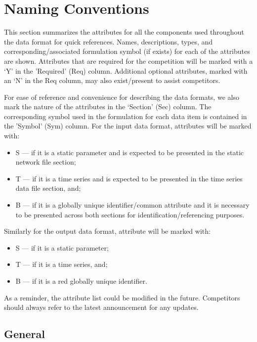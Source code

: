 \documentclass{article}
\begin{document}
\section{Naming Conventions}
\label{sec:naming}
This section summarizes the attributes for all the components used throughout the data format for quick references.
Names, descriptions, types, and corresponding/associated formulation symbol (if exists) for each of the attributes are shown.
Attributes that are required for the competition
will be marked with a `Y' in the 'Required' (Req) column.
Additional optional attributes, marked with an `N' in the Req column, may also exist/present to assist competitors.

For ease of reference and convenience for describing the data formats, we also
mark the nature of the attributes in the `Section' (Sec) column. The corresponding symbol used in the formulation for each data item is contained in the 'Symbol' (Sym) column.
For the input data format, attributes will be marked with:
\begin{itemize}
\item S --- if it is a static parameter and is expected to be presented in the static network file section;
\item T --- if it is a time series and is expected to be presented in the time series data file section, and;
\item B --- if it is a globally unique identifier/common attribute and it is necessary to be presented across both sections for identification/referencing purposes.
\end{itemize}
Similarly for the output data format, attribute will be marked with:
\begin{itemize}
\item S --- if it is a static parameter;
\item T --- if it is a time series, and;
\item B --- if it is a red globally unique identifier.
\end{itemize}
As a reminder, the attribute list could be modified in the future.
Competitors should always refer to the latest announcement for any
updates.





\subsection{General}
\label{nom:top-level}
\end{document}
